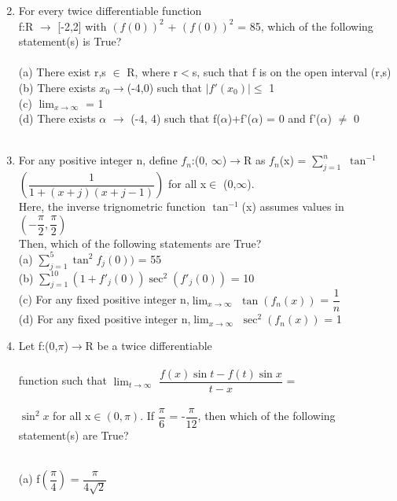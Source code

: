 \begin{enumerate}[label=\arabic*.,ref=\thesubsection.\theenumi]
\begin{itemize}
\begin{multicols}{2}
	\end{multicols}
	\end{itemize}
	\item For every twice differentiable function\\
	 f:R $\to$ [-2,2] with $(f(0))^2$ + $(f(0))^2$ = 85, which of the following statement(s) is True?\\
	 \\
	(a) There exist r,s $\in$ R, where r$<$s, such that f is on the open interval (r,s)\\
	(b) There exists $x_0\to$(-4,0) such that $|f'(x_0)|\leq$ 1 \\
	(c) $\displaystyle{\lim_{x \to \infty}}$ = 1\\
	(d) There exists $\alpha$ $\to$ (-4, 4) such that f($\alpha$)+f'($\alpha$) = 0 and f'($\alpha$) $\neq$ 0\\
	\\
	\item For any positive integer n, define $f_n$:(0, $\infty$)$\to$R as $f_n$(x) = $\sum\limits_{j = 1}^n$ $\tan^{-1}$ $\left(\dfrac{1}{1+(x+j)(x+j-1)}\right)$ for all x$\in$ (0,$\infty$).\\
	Here, the inverse trignometric function $\tan^{-1}$(x) assumes values in $\left(-\dfrac{\pi}{2}, \dfrac{\pi}{2}\right)$\\
	Then, which of the following statements are True?\\
	(a) $\sum\limits_{j=1}^5 \tan^2 f_j(0))$ = 55\\
	(b) $\sum\limits_{j=1}^{10} (1+f'_j(0))\sec^2(f'_j(0))$ = 10\\
	(c) For any fixed positive integer n,$\displaystyle{\lim_{x \to \infty}}$ $\tan (f_n(x))$ = $\dfrac{1}{n}$\\
	(d)  For any fixed positive integer n,$\displaystyle{\lim_{x \to \infty}}$ $\sec^2 (f_n(x))$ = 1 
	\item Let f:(0,$\pi$)$\to$R be a twice differentiable \\
	\\
	function such that $\displaystyle{\lim_{t \to \infty}}$ $\dfrac{f(x)\sin t-f(t)\sin x}{t-x}$ = \\
	\\
	$\sin^2x$ for all x$\in(0,\pi)$. If $\dfrac{\pi}{6}$ = -$\dfrac{\pi}{12}$, then which of the following statement(s)  are True?\\
	\\
	\item [(a)] f$\left(\dfrac{\pi}{4}\right)$ = $\dfrac{\pi}{4\sqrt{2}}$\\
	

\end{enumerate}

